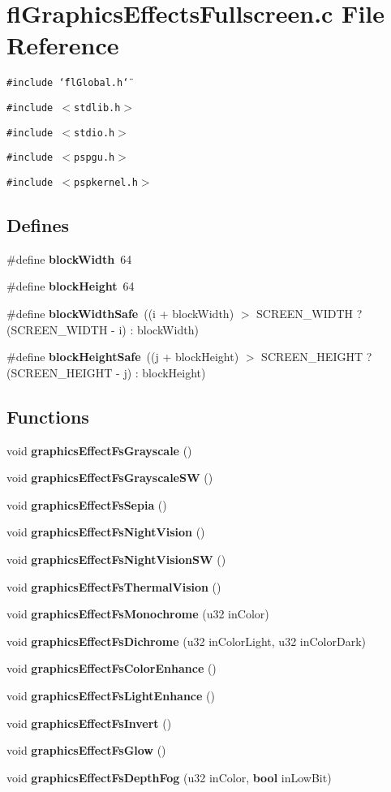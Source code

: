 \section{fl\-Graphics\-Effects\-Fullscreen.c File Reference}
\label{flGraphicsEffectsFullscreen_8c}
{\tt \#include \char`\"{}fl\-Global.h\char`\"{}}\par
{\tt \#include $<$stdlib.h$>$}\par
{\tt \#include $<$stdio.h$>$}\par
{\tt \#include $<$pspgu.h$>$}\par
{\tt \#include $<$pspkernel.h$>$}\par
\subsection*{Defines}
\begin{CompactItemize}
\item 
\#define {\bf block\-Width}~64
\item 
\#define {\bf block\-Height}~64
\item 
\#define {\bf block\-Width\-Safe}~((i + block\-Width) $>$ SCREEN\_\-WIDTH ? (SCREEN\_\-WIDTH - i) : block\-Width)
\item 
\#define {\bf block\-Height\-Safe}~((j + block\-Height) $>$ SCREEN\_\-HEIGHT ? (SCREEN\_\-HEIGHT - j) : block\-Height)
\end{CompactItemize}
\subsection*{Functions}
\begin{CompactItemize}
\item 
void {\bf graphics\-Effect\-Fs\-Grayscale} ()
\item 
void {\bf graphics\-Effect\-Fs\-Grayscale\-SW} ()
\item 
void {\bf graphics\-Effect\-Fs\-Sepia} ()
\item 
void {\bf graphics\-Effect\-Fs\-Night\-Vision} ()
\item 
void {\bf graphics\-Effect\-Fs\-Night\-Vision\-SW} ()
\item 
void {\bf graphics\-Effect\-Fs\-Thermal\-Vision} ()
\item 
void {\bf graphics\-Effect\-Fs\-Monochrome} (u32 in\-Color)
\item 
void {\bf graphics\-Effect\-Fs\-Dichrome} (u32 in\-Color\-Light, u32 in\-Color\-Dark)
\item 
void {\bf graphics\-Effect\-Fs\-Color\-Enhance} ()
\item 
void {\bf graphics\-Effect\-Fs\-Light\-Enhance} ()
\item 
void {\bf graphics\-Effect\-Fs\-Invert} ()
\item 
void {\bf graphics\-Effect\-Fs\-Glow} ()
\item 
void {\bf graphics\-Effect\-Fs\-Depth\-Fog} (u32 in\-Color, {\bf bool} in\-Low\-Bit)
\end{CompactItemize}


